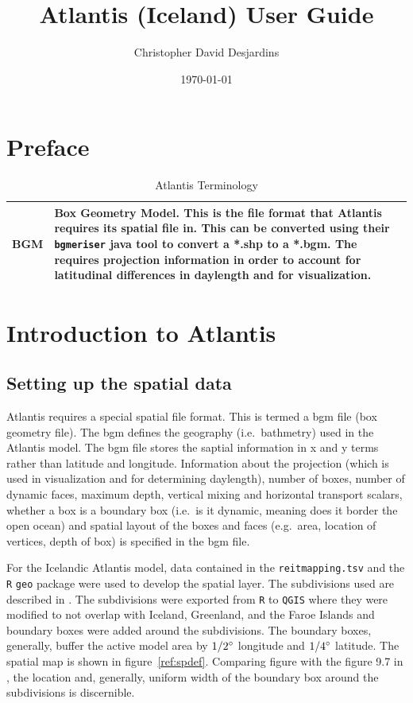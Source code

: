 \documentclass{report}
\begin{document}
\title{Atlantis (Iceland) User Guide}
\author{Christopher David Desjardins}
\date{\today}
\maketitle
\newpage

\tableofcontents
\newpage

\chapter{Preface}

\begin{table}[!htbp]
\caption{Atlantis Terminology}
\begin{tabular}{lp{10cm}}
\hline
BGM & Box Geometry Model. This is the file format that Atlantis requires its spatial file in. This can be converted using their \texttt{bgmeriser} java tool to convert a *.shp to a *.bgm. The requires projection information in order to account for latitudinal differences in daylength and for visualization. \\
\hline
\end{tabular}
\end{table}


\chapter{Introduction to Atlantis}

\newpage
\section{Setting up the spatial data}

Atlantis requires a special spatial file format. This is termed a bgm file (box geometry file). The bgm defines the geography (i.e.\ bathmetry) used in the Atlantis model. The bgm file stores the saptial information in x and y terms rather than latitude and longitude. Information about the projection (which is used in visualization and for determining daylength), number of boxes, number of dynamic faces, maximum depth, vertical mixing and horizontal transport scalars, whether a box is a boundary box (i.e.\ is it dynamic, meaning does it border the open ocean) and spatial layout of the boxes and faces (e.g.\ area, location of vertices, depth of box) is specified in the bgm file. 

 For the Icelandic Atlantis model, data contained in the
 \texttt{reitmapping.tsv} and the \texttt{R} \texttt{geo} package were
 used to develop the spatial layer. The subdivisions used are
 described in \cite{dst2}. The subdivisions were exported from
 \texttt{R} to \texttt{QGIS} where they were modified to not overlap
 with Iceland, Greenland, and the Faroe Islands and boundary boxes
 were added around the subdivisions. The boundary boxes, generally,
 buffer the active model area by $1/2\degree$ longitude and
 $1/4\degree$ latitude. The spatial map is shown in figure~\ref{ref:spdef}. Comparing figure with the figure 9.7 in
 \cite{dst2}, the location and, generally, uniform width of the
 boundary box around the subdivisions is discernible. 
\end{document}
